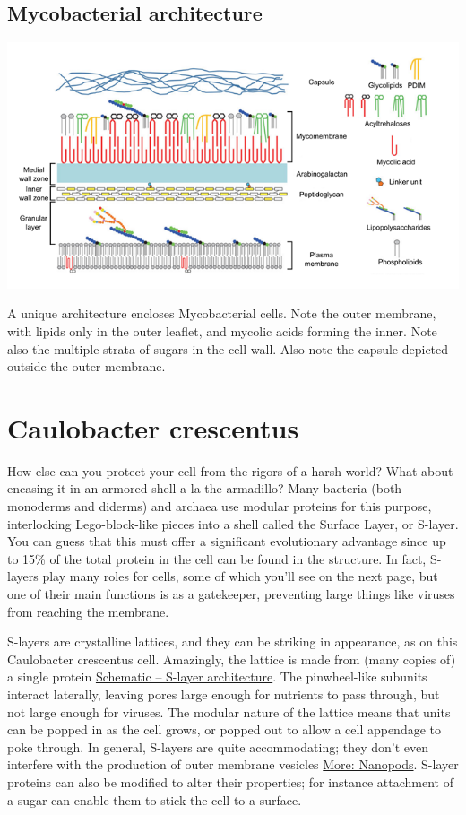 \documentclass[]{tufte-book}
\begin{document}
\hypertarget{Mycobacterial_architecture}{\subsection{Mycobacterial
architecture}\label{Mycobacterial_architecture}}

\includegraphics{img/02_schematic/2_5_1_Mycobacteria}

A unique architecture encloses Mycobacterial cells. Note the outer
membrane, with lipids only in the outer leaflet, and mycolic acids
forming the inner. Note also the multiple strata of sugars in the cell
wall. Also note the capsule depicted outside the outer membrane.

\section{Caulobacter crescentus}\label{caulobacter-crescentus}

How else can you protect your cell from the rigors of a harsh world?
What about encasing it in an armored shell a la the armadillo? Many
bacteria (both monoderms and diderms) and archaea use modular proteins
for this purpose, interlocking Lego-block-like pieces into a shell
called the Surface Layer, or S-layer. You can guess that this must offer
a significant evolutionary advantage since up to 15\% of the total
protein in the cell can be found in the structure. In fact, S-layers
play many roles for cells, some of which you'll see on the next page,
but one of their main functions is as a gatekeeper, preventing large
things like viruses from reaching the membrane.

S-layers are crystalline lattices, and they can be striking in
appearance, as on this Caulobacter crescentus cell. Amazingly, the
lattice is made from (many copies of) a single protein
\protect\hyperlink{S-layer_architecture}{Schematic -- S-layer
architecture}. The pinwheel-like subunits interact laterally, leaving
pores large enough for nutrients to pass through, but not large enough
for viruses. The modular nature of the lattice means that units can be
popped in as the cell grows, or popped out to allow a cell appendage to
poke through. In general, S-layers are quite accommodating; they don't
even interfere with the production of outer membrane vesicles
\protect\hyperlink{Nanopods}{More: Nanopods}. S-layer proteins can also
be modified to alter their properties; for instance attachment of a
sugar can enable them to stick the cell to a surface.
\end{document}
